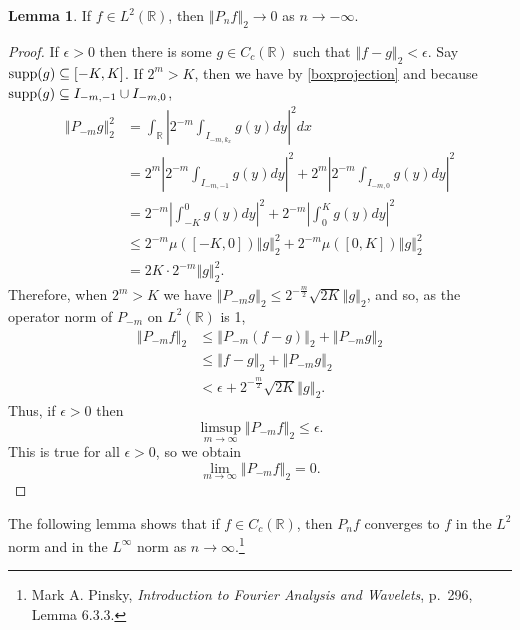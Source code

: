 \documentclass{article}
\newcommand{\supp}{\ensuremath\mathrm{supp}}
\newcommand{\norm}[1]{\left\Vert #1 \right\Vert}
\theoremstyle{definition}
\newtheorem{lemma}[theorem]{Lemma}
\theoremstyle{definition}
\begin{document}
\begin{lemma}
If $f \in L^2(\mathbb{R})$, then $\norm{P_n f}_2 \to 0$ as $n \to -\infty$.
\label{negativelimit}
\end{lemma}
\begin{proof}
If $\epsilon>0$ then there is some $g \in C_c(\mathbb{R})$ such that $\norm{f-g}_2<\epsilon$. Say $\supp(g) \subseteq [-K,K]$. If $2^m > K$, then
we have by \eqref{boxprojection} and because $\supp(g) \subseteq I_{-m,-1} \cup I_{-m,0}$,
\begin{align*}
\norm{P_{-m}g}_2^2&=\int_{\mathbb{R}} \left| 2^{-m} \int_{I_{-m,k_x}} g(y) dy \right|^2 dx\\
&=2^m \left|2^{-m} \int_{I_{-m,-1}} g(y) dy \right|^2+2^m\left|2^{-m} \int_{I_{-m,0}} g(y) dy \right|^2\\
&=2^{-m} \left| \int_{-K}^0 g(y) dy \right|^2+2^{-m} \left| \int_0^K g(y) dy \right|^2\\
&\leq 2^{-m} \mu([-K,0]) \norm{g}_2^2 +2^{-m} \mu([0,K]) \norm{g}_2^2 \\
&=2K \cdot 2^{-m} \norm{g}_2^2.
\end{align*}
Therefore,  when $2^m > K$ we have $\norm{P_{-m}g}_2 \leq 2^{-\frac{m}{2}} \sqrt{2K} \norm{g}_2$, and so, as the operator norm of $P_{-m}$ on $L^2(\mathbb{R})$ is 1,
\begin{align*}
\norm{P_{-m}f}_2& \leq \norm{P_{-m}(f-g)}_2 + \norm{P_{-m}g}_2\\
& \leq \norm{f-g}_2 + \norm{P_{-m}g}_2\\
& < \epsilon+  2^{-\frac{m}{2}} \sqrt{2K} \norm{g}_2.
\end{align*}
Thus, if $\epsilon>0$ then
\[
\limsup_{m \to \infty} \norm{P_{-m} f}_2 \leq \epsilon.
\]
This is true for all $\epsilon>0$, so we obtain
\[
\lim_{m \to \infty} \norm{P_{-m}f}_2 = 0.
\]
\end{proof}



The following lemma shows that if $f \in C_c(\mathbb{R})$, then $P_nf$ converges to $f$ in
the $L^2$ norm and in the $L^\infty$ norm as $n \to \infty$.\footnote{Mark A. Pinsky, {\em Introduction to Fourier Analysis and Wavelets}, p.~296, Lemma 6.3.3.}
\end{document}
